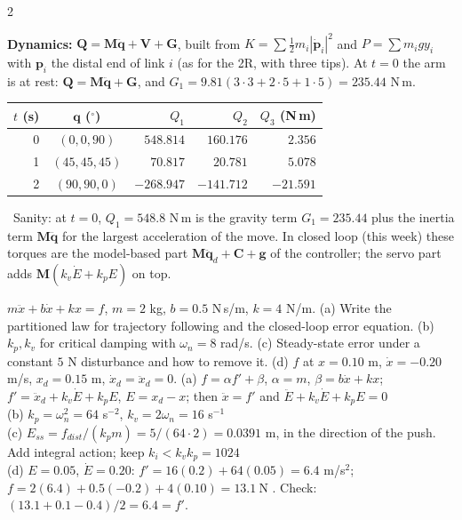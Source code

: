 \begin{multicols}{2}
\begin{examq}
\textbf{Dynamics:} $\mathbf Q=\mathbf M\ddot{\mathbf q}+\mathbf V+\mathbf G$, built from $K=\sum\tfrac12m_i|\dot{\mathbf p}_i|^2$ and $P=\sum m_igy_i$ with $\mathbf p_i$ the distal end of link $i$ (as for the 2R, with three tips). At $t=0$ the arm is at rest: $\mathbf Q=\mathbf M\ddot{\mathbf q}+\mathbf G$, and $G_1=9.81(3\cdot3+2\cdot5+1\cdot5)=235.44$ N\,m.
\begin{center}
\begin{tabular}{@{}rcrrr@{}}\toprule
$t$ (s) & $\mathbf q$ ($^\circ$) & $Q_1$ & $Q_2$ & $Q_3$ (N\,m)\\\midrule
0 & $(0,0,90)$ & $548.814$ & $160.176$ & $2.356$\\
1 & $(45,45,45)$ & $70.817$ & $20.781$ & $5.078$\\
2 & $(90,90,0)$ & $-268.947$ & $-141.712$ & $-21.591$\\\bottomrule
\end{tabular}
\end{center}
\chk\ Sanity: at $t=0$, $Q_1=548.8$ N\,m is the gravity term $G_1=235.44$ plus the inertia term $\mathbf M\ddot{\mathbf q}$ for the largest acceleration of the move. In closed loop (this week) these torques are the model-based part $\mathbf M\ddot{\mathbf q}_d+\mathbf C+\mathbf g$ of the controller; the servo part adds $\mathbf M(k_v\dot E+k_pE)$ on top.
\end{examq}
\begin{examq}
$m\ddot x+b\dot x+kx=f$, $m=2$ kg, $b=0.5$ N\,s/m, $k=4$ N/m. (a) Write the partitioned law for trajectory following and the closed-loop error equation. (b) $k_p,k_v$ for critical damping with $\omega_n=8$ rad/s. (c) Steady-state error under a constant $5$ N disturbance and how to remove it. (d) $f$ at $x=0.10$ m, $\dot x=-0.20$ m/s, $x_d=0.15$ m, $\dot x_d=\ddot x_d=0$.
\solution
(a) $f=\alpha f'+\beta$, $\alpha=m$, $\beta=b\dot x+kx$; $f'=\ddot x_d+k_v\dot E+k_pE$, $E=x_d-x$; then $\ddot x=f'$ and $\ddot E+k_v\dot E+k_pE=0$ \\
(b) $k_p=\omega_n^2=64$ s$^{-2}$, $k_v=2\omega_n=16$ s$^{-1}$ \\
(c) $E_{ss}=f_{dist}/(k_pm)=5/(64\cdot2)=0.0391$ m, in the direction of the push. Add integral action; keep $k_i<k_vk_p=1024$ \\
(d) $E=0.05$, $\dot E=0.20$: $f'=16(0.2)+64(0.05)=6.4$ m/s$^2$; $f=2(6.4)+0.5(-0.2)+4(0.10)=\boxed{13.1\ \text{N}}$ . Check: $(13.1+0.1-0.4)/2=6.4=f'$. \chk

\end{examq}
\end{multicols}
